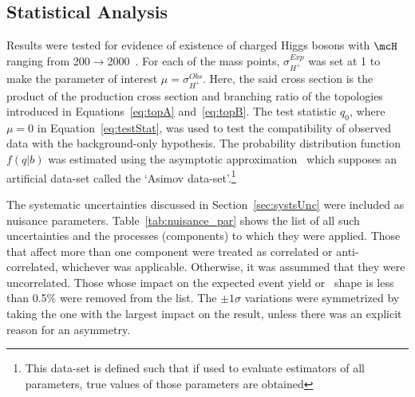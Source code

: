 \subsection{Statistical Analysis}
\label{sec:chStat}
\par Results were tested for evidence of existence of charged Higgs bosons with $\mcH$ ranging 
from 200$\to$2000~\GeV. For each of the mass points, $\sigma^{Exp}_{H^+}$ was set at 
1 to make the parameter of interest $\mu=\sigma^{Obs}_{H^+}$. Here, the said cross section is 
the product of the production cross section and branching ratio of the topologies introduced in 
Equations~\ref{eq:topA} and~\ref{eq:topB}. The test statistic $q_0$, where $\mu=0$ 
in Equation~\ref{eq:testStat}, was used to test the compatibility 
of observed data with the background-only hypothesis. The probability distribution function 
$f(q|b)$ was estimated using the asymptotic approximation~\cite{Cowan:2010js} which 
supposes an artificial data-set called the `Asimov data-set'.\footnote{This data-set is 
defined such that if used to evaluate estimators of all parameters, true values of those 
parameters are obtained}   

\par The systematic uncertainties discussed in 
Section~\ref{sec:systsUnc} were included as nuisance parameters. 
Table~\ref{tab:nuisance_par} shows the list of all such uncertainties and 
the processes (components) to which they were applied. Those that affect more than one 
component were treated as correlated or anti-correlated, whichever was applicable. Otherwise, 
it was assummed that they were uncorrelated. Those whose 
impact on the expected event yield or \mT\ shape is less than 0.5\% were removed from the list.   
The $\pm1\sigma$ variations were symmetrized by taking the one with the largest impact on 
the result, unless there was an explicit reason for an asymmetry.  

